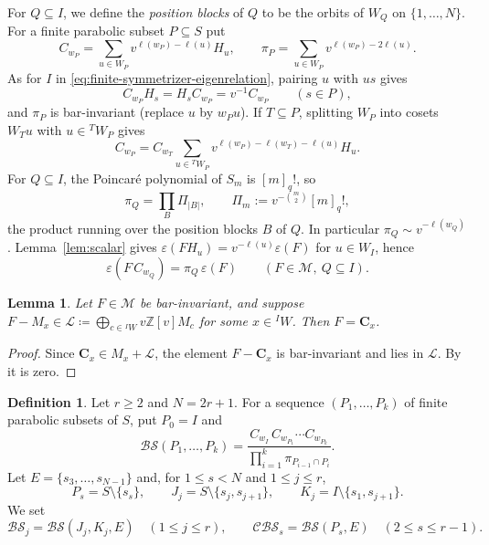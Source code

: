 \documentclass[11pt,a4paper,reqno]{amsart}
\numberwithin{equation}{section}
\newtheorem{lemma}[theorem]{Lemma}
\theoremstyle{definition}
\newtheorem{definition}[theorem]{Definition}
\theoremstyle{remark}
\theoremstyle{plain}
\newcommand{\C}{\mathbf C}
\newcommand{\M}{\mathcal M}
\newcommand{\eps}{\varepsilon}
\newcommand{\D}{\mathcal {BS}}
\newcommand{\R}{\mathcal {BS}}
\newcommand{\V}{\mathcal {CBS}}
\begin{document}
 For $Q\subseteq I$, we define the  \emph{position blocks} of $Q$ to be 
 the orbits of $W_Q$ on 
$\{1,\ldots,N\}$. 
For a finite parabolic subset $P\subseteq S$ put
\[
 C_{w_P}=\sum_{u\in W_P}v^{\ell(w_P)-\ell(u)}H_u,\qquad
 \pi_P=\sum_{u\in W_P}v^{\ell(w_P)-2\ell(u)}.
\]
As for $I$ in \eqref{eq:finite-symmetrizer-eigenrelation}, pairing $u$ with $us$ gives
\begin{equation}\label{eq:parabolic-eigenrelation}
 C_{w_P}H_s=H_sC_{w_P}=v^{-1}C_{w_P}\qquad(s\in P),
\end{equation}
and $\pi_P$ is bar-invariant (replace $u$ by $w_Pu$). If $T\subseteq P$, splitting $W_P$ into cosets
$W_Tu$ with $u\in{}^TW_P$ gives
\begin{equation}\label{eq:parabolic-decomposition}
 C_{w_P}=C_{w_T}\sum_{u\in{}^TW_P}v^{\ell(w_P)-\ell(w_T)-\ell(u)}H_u.
\end{equation}
For $Q\subseteq I$, the Poincar\'e polynomial of $S_m$ is $[m]_q!$, so
\begin{equation}\label{eq:pi-blocks}
 \pi_Q=\prod_{B}\Pi_{|B|},\qquad \Pi_m:=v^{-\binom m2}[m]_q!,
\end{equation}
the product running over the position blocks $B$ of $Q$. In particular $\pi_Q\sim v^{-\ell(w_Q)}$.
Lemma~\ref{lem:scalar} gives $\eps(FH_u)=v^{-\ell(u)}\eps(F)$ for $u\in W_I$, hence
\begin{equation}\label{eq:eps-pi}
 \eps(F\,C_{w_Q})=\pi_Q\,\eps(F)\qquad(F\in\M,\ Q\subseteq I).
\end{equation}

\begin{lemma}\label{lem:criterion}
Let $F\in\M$ be bar-invariant, and suppose $F-M_x\in\mathcal L\coloneqq\bigoplus_{c\in{}^IW}v\mathbb Z[v]M_c$
for some $x\in{}^IW$. Then $F=\C_x$.
\end{lemma}
\begin{proof}
Since $\C_x\in M_x+\mathcal L$, the element $F-\C_x$ is bar-invariant and lies in $\mathcal L$.
By \cite[Claim~2.4]{Soergel} it is zero.
\end{proof}

\begin{definition}\label{def:products}
Let $r\geq2$ and $N=2r+1$. For a sequence $(P_1,\ldots,P_k)$ of finite parabolic subsets of $S$, put $P_0=I$ and
\begin{equation}\label{eq:D}
 \D(P_1,\ldots,P_k)=
 \frac{C_{w_I}\,C_{w_{P_1}}\cdots C_{w_{P_k}}}
 {\prod_{i=1}^{k}\pi_{P_{i-1}\cap P_i}}.
\end{equation}
Let $E=\{s_3,\ldots,s_{N-1}\}$ and, for $1\leq s<N$ and $1\leq j\leq r$,
\[
 P_s=S\setminus\{s_s\},\qquad
 J_j=S\setminus\{s_j,s_{j+1}\},\qquad
 K_j=I\setminus\{s_1,s_{j+1}\}.
\]
We set
\[
 \R_j=\D(J_j,K_j,E)\quad(1\leq j\leq r),\qquad
 \V_s=\D(P_s,E)\quad(2\leq s\leq r-1).
\]
\end{definition}
\end{document}
